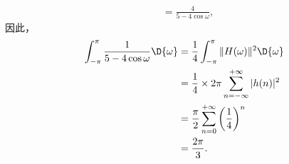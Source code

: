 \begin{solution}
\begin{enumerate}[label=(\arabic*)]
\begin{align*}
                & = \frac{4}{5 - 4\cos\omega},
            \end{align*}
            因此，
            \begin{align*}
                \int_{-\pi}^{\pi}\frac{1}{5 - 4\cos\omega}\D{\omega} & = \frac{1}{4}\int_{-\pi}^{\pi}\|H(\omega)\|^2\D{\omega} \\
                & = \frac{1}{4}\times 2\pi\sum_{n = -\infty}^{+\infty}|h(n)|^2 \\
                & = \frac{\pi}{2}\sum_{n = 0}^{+\infty}\left(\frac{1}{4}\right)^{n} \\
                & = \frac{2\pi}{3}.
            \end{align*}
    \end{enumerate}
\end{solution}
